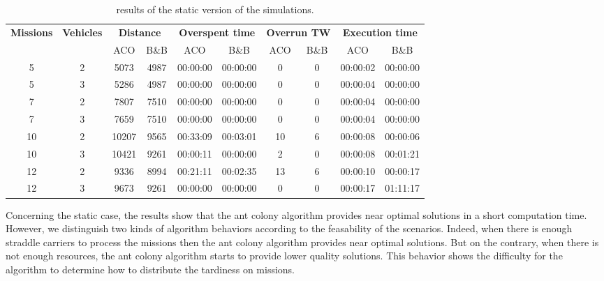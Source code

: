 \documentclass[review]{elsarticle}
\begin{document}
  \small
\begin{table}[h]
  \begin{center}
    \begin{tabular}{|c|c|c|c|c|c|c|c|c|c|} 
    \hline
      \multirow{2}{*}{\bf{Missions}} & \multirow{2}{*}{\bf{Vehicles}} & \multicolumn{2}{|c|}{\bf{Distance}} & \multicolumn{2}{|c|}{\bf{Overspent time}} & \multicolumn{2}{|c|}{\bf{Overrun TW}} &  \multicolumn{2}{|c|}{\bf{Execution time}} \\\cline{3-10}
		 &	& ACO 	& B\&B	& ACO	& B\&B		& ACO		& B\&B	& ACO		& B\&B\\ \hline
	5	 & 2 	& 5073	& 4987	& 00:00:00	& 00:00:00 	& 0	& 0	& 00:00:02	& 00:00:00\\
	5	 & 3 	& 5286	& 4987	& 00:00:00	& 00:00:00	& 0	& 0	& 00:00:04	& 00:00:00\\
	7	 & 2	& 7807	& 7510	& 00:00:00	& 00:00:00	& 0	& 0	& 00:00:04	& 00:00:00\\
	7	 & 3	& 7659	& 7510	& 00:00:00	& 00:00:00	& 0	& 0	& 00:00:04	& 00:00:00\\
	10	 & 2	& 10207	& 9565	& 00:33:09	& 00:03:01	& 10	& 6	& 00:00:08	& 00:00:06\\
	10	 & 3	& 10421	& 9261	& 00:00:11	& 00:00:00	& 2	& 0	& 00:00:08	& 00:01:21\\
	12	 & 2	& 9336	& 8994	& 00:21:11	& 00:02:35	& 13	& 6	& 00:00:10	& 00:00:17\\
	12	 & 3	& 9673	& 9261	& 00:00:00	& 00:00:00	& 0	& 0	& 00:00:17	& 01:11:17\\
      \hline
    \end{tabular}
  \caption{results of the static version of the simulations.}
  \end{center}
\end{table}
  \normalsize

  Concerning the static case, the results show that the ant colony algorithm provides near optimal solutions in a short computation time. However, we distinguish two kinds of algorithm behaviors according to the feasability of the scenarios. Indeed, when there is enough straddle carriers to process the missions then the ant colony algorithm provides near optimal solutions. But on the contrary, when there is not enough resources, the ant colony algorithm starts to provide lower quality solutions. This behavior shows the difficulty for the algorithm to determine how to distribute the tardiness on missions.

\end{document}
